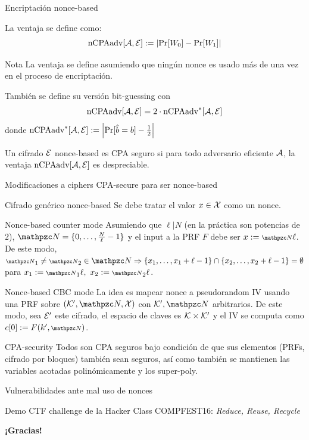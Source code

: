 \begin{frame}[allowframebreaks]{Encriptación nonce-based}
\begin{definition}
    La ventaja se define como:
    \begin{equation*}
      \text{nCPAadv}[\mathcal{A}, \mathcal{E}] := \left|\text{Pr}[W_0] - \text{Pr}[W_1]\right|
    \end{equation*}
  \end{definition}

  \begin{block}{Nota}
    La ventaja se define asumiendo que ningún nonce es usado más de una vez en el proceso 
    de encriptación.

    También se define su versión bit-guessing con
    \begin{equation*}
      \text{nCPAadv}[\mathcal{A}, \mathcal{E}] = 2 \cdot \text{nCPAadv}^*[\mathcal{A}, \mathcal{E}]
    \end{equation*}
    donde $\text{nCPAadv}^*[\mathcal{A},\mathcal{E}] := \left|\text{Pr}[\hat{b} = b] - \frac{1}{2}\right|$
  \end{block}
  \begin{definition}
    Un cifrado $\mathcal{E}$ nonce-based es CPA seguro si para todo adversario eficiente $\mathcal{A}$, la ventaja 
    $\text{nCPAadv}[\mathcal{A}, \mathcal{E}]$ es despreciable.
  \end{definition}
\end{frame}

\begin{frame}[allowframebreaks]{Modificaciones a ciphers CPA-secure para ser nonce-based}
  \begin{block}{Cifrado genérico nonce-based}
    Se debe tratar el valor $x \in \mathcal{X}$ como un nonce.
  \end{block}
  \begin{block}{Nonce-based counter mode}
    Asumiendo que $\ell | N$ (en la práctica son potencias de $2$), $\Nonce = \{0,\dots,\frac{N}{\ell}-1\}$
    y el input a la PRF $F$ debe ser $x := \nonce\ell$.
    De este modo, $\nonce_1 \neq \nonce_2 \in \Nonce \Rightarrow \{x_1,\dots,x_1+\ell-1\} \cap \{x_2,\dots,x_2+\ell-1\} = \emptyset$
    para $x_1 := \nonce_1\ell,\ x_2 := \nonce_2\ell$.
  \end{block}
  \begin{block}{Nonce-based CBC mode}
    La idea es mapear nonce a pseudorandom IV usando una PRF sobre $(\K',\Nonce,\X)$ con 
    $\K', \Nonce$ arbitrarios.
    De este modo, sea $\mathcal{E}'$ este cifrado, el espacio de claves es $\mathcal{K} \times \mathcal{K}'$ y el 
    IV se computa como $c[0] := F(k', \nonce)$.
  \end{block}
  \begin{block}{CPA-security}
    Todos son CPA seguros bajo condición de que sus elementos (PRFs, cifrado por bloques) 
    también sean seguros, así como también se mantienen las variables acotadas polinómicamente
    y los super-poly.
  \end{block}
\end{frame}
\begin{frame}{Vulnerabilidades ante mal uso de nonces}
  \begin{example}
    Demo CTF challenge de la Hacker Class COMPFEST16: \textit{Reduce, Reuse, Recycle}
  \end{example}
\end{frame}

\begin{frame}
  \centering 
  \vfill 
  {\Huge \textbf{¡Gracias!}}
  \vfill
\end{frame}


